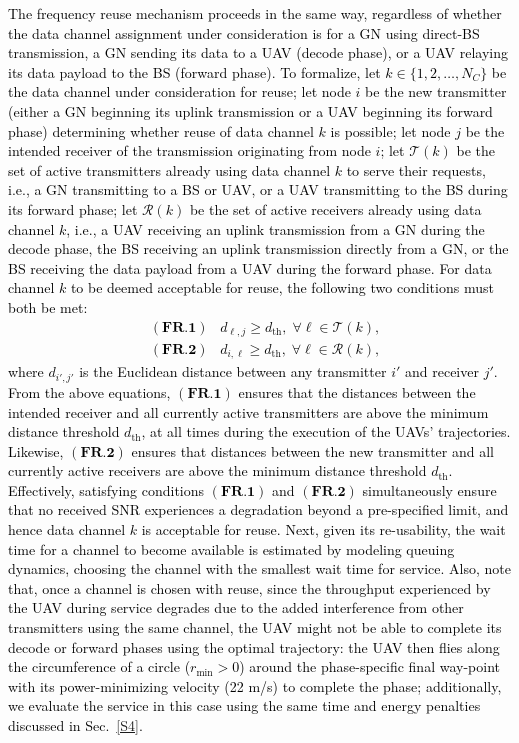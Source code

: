 \documentclass[10pt, twocolumn]{IEEEtran}
\theoremstyle{plain}
\theoremstyle{definition}
\theoremstyle{remark}
\newcommand\hlt[1]{\textcolor{black}{#1}}
\begin{document}
\hlt{The frequency reuse mechanism proceeds in the same way, regardless of whether the data channel assignment under consideration is for a GN using direct-BS transmission, a GN sending its data to a UAV (decode phase), or a UAV relaying its data payload to the BS (forward phase). To formalize, let $k{\in}\{1,2,{\dots},N_C\}$ be the data channel under consideration for reuse; let node $i$ be the new transmitter (either a GN beginning its uplink transmission or a UAV beginning its forward phase) determining whether reuse of data channel $k$ is possible; let node $j$ be the intended receiver of the transmission originating from node $i$; let $\mathcal T (k)$ be the set of active transmitters already using data channel $k$ to serve their requests, i.e., a GN transmitting to a BS or UAV, or a UAV transmitting to the BS during its forward phase; let $\mathcal R (k)$ be the set of active receivers already using data channel $k$, i.e., a UAV receiving an uplink transmission from a GN during the decode phase, the BS receiving an uplink transmission directly from a GN, or the BS receiving the data payload from a UAV during the forward phase. For data channel $k$ to be deemed acceptable for reuse, the following two conditions must both be met:
\begin{align}
    &(\textbf{FR.1}) \;\;\; d_{\ell,j} \geq d_{\mathrm{th}}, \; \forall \ell \in \mathcal T (k), \\
    &(\textbf{FR.2}) \;\;\; d_{i,\ell} \geq d_{\mathrm{th}}, \; \forall \ell \in \mathcal R (k),
\end{align}
where $d_{i',j'}$ is the Euclidean distance between any transmitter $i'$ and receiver $j'$. From the above equations, $(\textbf{FR.1})$ ensures that the distances between the intended receiver and all currently active transmitters are above the minimum distance threshold $d_{\mathrm{th}}$, at all times during the execution of the UAVs' trajectories. Likewise, $(\textbf{FR.2})$ ensures that distances between the new transmitter and all currently active receivers are above the minimum distance threshold $d_{\mathrm{th}}$. Effectively, satisfying conditions $(\textbf{FR.1})$ and $(\textbf{FR.2})$ simultaneously ensure that no received SNR experiences a degradation beyond a pre-specified limit, and hence data channel $k$ is acceptable for reuse. Next, given its re-usability, the wait time for a channel to become available is estimated by modeling queuing dynamics, choosing the channel with the smallest wait time for service. Also, note that, once a channel is chosen with reuse, since the throughput experienced by the UAV during service degrades due to the added interference from other transmitters using the same channel, the UAV might not be able to complete its decode or forward phases using the optimal trajectory: the UAV then flies along the circumference of a circle ($r_{\min}{>}0$) around the phase-specific final way-point with its power-minimizing velocity (22 m/s) to complete the phase; additionally, we evaluate the service in this case using the same time and energy penalties discussed in Sec.~\ref{S4}.}
\end{document}
